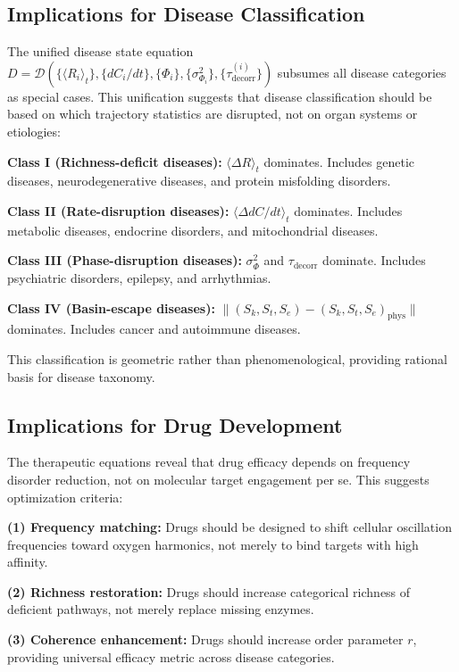 \documentclass[12pt,a4paper]{article}
\theoremstyle{definition}
\theoremstyle{remark}
\newcommand{\Scoord}{(\Sk,\St,\Se)}
\newcommand{\Sk}{S_k}
\newcommand{\St}{S_t}
\newcommand{\Se}{S_e}
\newcommand{\taudecorr}{\tau_{\mathrm{decorr}}}
\begin{document}
\subsection{Implications for Disease Classification}

The unified disease state equation $D = \mathcal{D}(\{\langle R_i\rangle_t\}, \{dC_i/dt\}, \{\Phi_i\}, \{\sigma_{\Phi_i}^2\}, \{\taudecorr^{(i)}\})$ subsumes all disease categories as special cases. This unification suggests that disease classification should be based on which trajectory statistics are disrupted, not on organ systems or etiologies:

\textbf{Class I (Richness-deficit diseases):} $\langle\Delta R\rangle_t$ dominates. Includes genetic diseases, neurodegenerative diseases, and protein misfolding disorders.

\textbf{Class II (Rate-disruption diseases):} $\langle\Delta dC/dt\rangle_t$ dominates. Includes metabolic diseases, endocrine disorders, and mitochondrial diseases.

\textbf{Class III (Phase-disruption diseases):} $\sigma_\Phi^2$ and $\taudecorr$ dominate. Includes psychiatric disorders, epilepsy, and arrhythmias.

\textbf{Class IV (Basin-escape diseases):} $\|\Scoord - \Scoord_{\mathrm{phys}}\|$ dominates. Includes cancer and autoimmune diseases.

This classification is geometric rather than phenomenological, providing rational basis for disease taxonomy.

\subsection{Implications for Drug Development}

The therapeutic equations reveal that drug efficacy depends on frequency disorder reduction, not on molecular target engagement per se. This suggests optimization criteria:

\textbf{(1) Frequency matching:} Drugs should be designed to shift cellular oscillation frequencies toward oxygen harmonics, not merely to bind targets with high affinity.

\textbf{(2) Richness restoration:} Drugs should increase categorical richness of deficient pathways, not merely replace missing enzymes.

\textbf{(3) Coherence enhancement:} Drugs should increase order parameter $r$, providing universal efficacy metric across disease categories.
\end{document}
